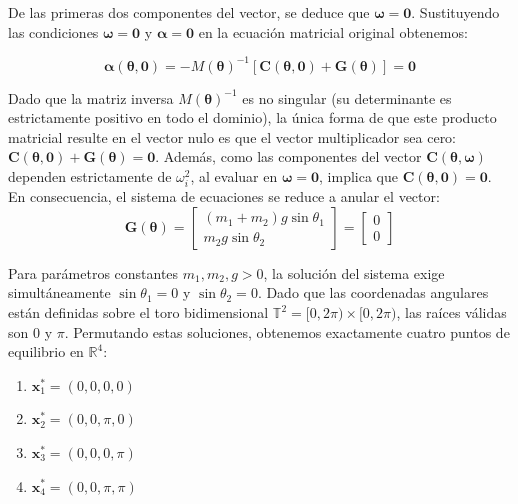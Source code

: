\documentclass[13pt]{extarticle}
\begin{document}
De las primeras dos componentes del vector, se deduce que $\boldsymbol{\omega} = \mathbf{0}$. Sustituyendo las condiciones $\boldsymbol{\omega} = \mathbf{0}$ y $\boldsymbol{\alpha} = \mathbf{0}$ en la ecuación matricial original obtenemos: 

\begin{equation}
    \boldsymbol{\alpha}(\boldsymbol{\theta}, \mathbf{0}) = -M(\boldsymbol{\theta})^{-1} [\mathbf{C}(\boldsymbol{\theta}, \mathbf{0}) + \mathbf{G}(\boldsymbol{\theta})] = \mathbf{0}
\end{equation}

Dado que la matriz inversa $M(\boldsymbol{\theta})^{-1}$ es no singular (su determinante es estrictamente positivo en todo el dominio), la única forma de que este producto matricial resulte en el vector nulo es que el vector multiplicador sea cero: $\mathbf{C}(\boldsymbol{\theta}, \mathbf{0}) + \mathbf{G}(\boldsymbol{\theta}) = \mathbf{0}$. Además, como las componentes del vector $\mathbf{C}(\boldsymbol{\theta}, \boldsymbol{\omega})$ dependen estrictamente de $\omega_i^2$, al evaluar en $\boldsymbol{\omega} = \mathbf{0}$, implica que $\mathbf{C}(\boldsymbol{\theta}, \mathbf{0}) = \mathbf{0}$. En consecuencia, el sistema de ecuaciones se reduce a anular el vector:
\begin{equation}
    \mathbf{G}(\boldsymbol{\theta}) = \begin{bmatrix}
    (m_1 + m_2)g \sin\theta_1 \\
    m_2 g \sin\theta_2
    \end{bmatrix} = \begin{bmatrix} 0 \\ 0 \end{bmatrix}
\end{equation}

Para parámetros constantes $m_1, m_2, g > 0$, la solución del sistema exige simultáneamente $\sin\theta_1 = 0$ y $\sin\theta_2 = 0$. Dado que las coordenadas angulares están definidas sobre el toro bidimensional $\mathbb{T}^2 = [0, 2\pi) \times [0, 2\pi)$, las raíces válidas son $0$ y $\pi$. Permutando estas soluciones, obtenemos exactamente cuatro puntos de equilibrio en $\mathbb{R}^4$:

\begin{enumerate}
    \item $\mathbf{x}^*_1 = (0, 0, 0, 0)$
    \item $\mathbf{x}^*_2 = (0, 0, \pi, 0)$
    \item $\mathbf{x}^*_3 = (0, 0, 0, \pi)$
    \item $\mathbf{x}^*_4 = (0, 0, \pi, \pi)$
\end{enumerate}
\end{document}
